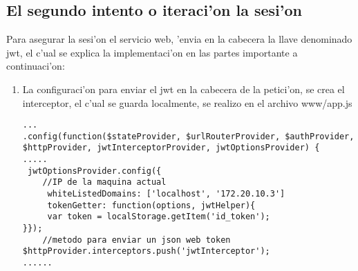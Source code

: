\subsection{El segundo intento o iteraci'on la sesi'on}
Para asegurar la sesi'on el servicio web, 'envia en la cabecera la llave denominado jwt, el c'ual se explica la implementaci'on en las partes importante a continuaci'on:
\begin{enumerate}
\item La configuraci'on para enviar el jwt en la cabecera de la petici'on, se crea el interceptor, el c'ual se guarda localmente, se realizo en el archivo www/app.js

\begin{verbatim}
...
.config(function($stateProvider, $urlRouterProvider, $authProvider, 
$httpProvider, jwtInterceptorProvider, jwtOptionsProvider) { 
.....
 jwtOptionsProvider.config({
 	//IP de la maquina actual 
	 whiteListedDomains: ['localhost', '172.20.10.3'] 
	 tokenGetter: function(options, jwtHelper){
	 var token = localStorage.getItem('id_token');
}});
	//metodo para enviar un json web token
$httpProvider.interceptors.push('jwtInterceptor');
......
\end{verbatim}
\end{enumerate}

